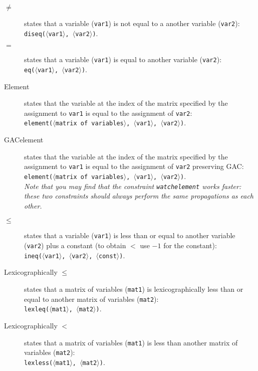 \documentclass{article}
\begin{document}
\begin{small}
\begin{description}
\item[$ \mathbf{\neq}$] states that a variable (\texttt{var1}) is not
equal to a another variable (\texttt{var2}):\\
\texttt{diseq($\langle$var1$\rangle$, $\langle$var2$\rangle$)}.

\item[$\mathbf{=}$] states that a variable (\texttt{var1}) is equal to
another variable (\texttt{var2}):\\
\texttt{eq($\langle$var1$\rangle$, $\langle$var2$\rangle$)}.

\item[Element] states that the variable at the index of the matrix
specified by the assignment to \texttt{var1} is equal to the
assignment of \texttt{var2}:\\ \texttt{element($\langle$matrix of
variables$\rangle$, $\langle$var1$\rangle$, $\langle$var2$\rangle$)}.

\item[GACelement] states that the variable at the index of the matrix
specified by the assignment to \texttt{var1} is equal to the
assignment of \texttt{var2} preserving GAC:\\ \texttt{element($\langle$matrix of
variables$\rangle$, $\langle$var1$\rangle$, $\langle$var2$\rangle$)}.\\
\emph{Note that you may find that the constraint \texttt{watchelement} works faster: these two constraints should always perform the same propagations as each other.}
 

\item[$\mathbf{\leq}$] states that a variable (\texttt{var1}) is less
than or equal to another variable (\texttt{var2}) plus a constant (to
obtain $<$ use $-1$ for the constant):\\
\texttt{ineq($\langle$var1$\rangle$, $\langle$var2$\rangle$,
$\langle$const$\rangle$)}.

\item[Lexicographically $\mathbf{\leq}$] states that a matrix of
variables (\texttt{mat1}) is lexicographically less than or equal to
another matrix of variables (\texttt{mat2}):\\
\texttt{lexleq($\langle$mat1$\rangle$, $\langle$mat2$\rangle$)}.

\item[Lexicographically $\mathbf{<}$] states that a matrix of
variables (\texttt{mat1}) is less than another matrix of variables
(\texttt{mat2}):\\
\texttt{lexless($\langle$mat1$\rangle$, $\langle$mat2$\rangle$)}.


\end{description}
\end{small}
\end{document}
